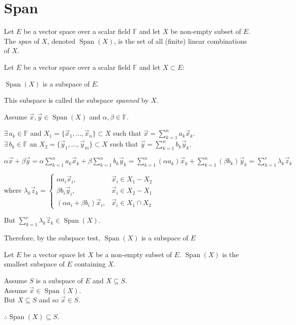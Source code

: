 \documentclass[letterpaper,12pt,fleqn]{article}
\renewcommand{\a}{\alpha}
\renewcommand{\b}{\beta}
\renewcommand{\l}{\lambda}
\newcommand{\F}{\mathbb{F}}
\newcommand{\vx}{\vec{x}}
\newcommand{\vy}{\vec{y}}
\newcommand{\vz}{\vec{z}}
\DeclareMathOperator{\spn}{Span}
\begin{document}
\section*{Span}

\begin{definition}[Span]
  Let $E$ be a vector space over a scalar field $\F$ and let $X$ be non-empty
  subset of $E$. The \emph{span} of $X$, denoted $\spn(X)$, is the set of all
  (finite) linear combinations of $X$.
\end{definition}

\begin{theorem}
  Let $E$ be a vector space over a scalar field $\F$ and let $X\subset E$:

  \qquad$\spn(X)$ is a subspace of $E$.

  This subspace is called the subspace \emph{spanned} by $X$.
\end{theorem}

\begin{theproof}
  Assume $\vx,\vy\in\spn(X)$ and $\a,\b\in\F$.
  
  $\exists\,a_k\in\F$ and $X_1=\{\vx_1,\ldots,\vx_n\}\subset X$ such that
  $\vx=\sum_{k=1}^na_k\vx_k$. \\
  $\exists\,b_k\in\F$ an $X_2=\{\vy_1,\ldots,\vy_m\}\subset X$ such that
  $\vy=\sum_{k=1}^nb_k\vy_k$.

  $\a\vx+\b\vy=\a\sum_{k=1}^na_k\vx_k+\b\sum_{k=1}^nb_k\vy_k=
  \sum_{k=1}^n(\a a_k)\vx_k+\sum_{k=1}^n(\b b_k)\vy_k=
  \sum_{k=1}^r\l_k\vz_k$

  where $\l_k\vz_k=\begin{cases}
  \a a_i\vx_i, & \vx_i\in X_1-X_2 \\
  \b b_i\vy_i, & \vx_i\in X_2-X_1 \\
  (\a a_i+\b b_i)\vx_i, & \vx_i\in X_1\cap X_2
  \end{cases}$

  But $\sum_{k=1}^r\l_k\vz_k\in\spn(X)$.

  Therefore, by the subspace test, $\spn(X)$ is a subspace of $E$
\end{theproof}

\begin{theorem}
  Let $E$ be a vector space let $X$ be a non-empty subset of $E$. $\spn(X)$ is
  the smallest subspace of $E$ containing $X$.
\end{theorem}

\begin{theproof}
  Assume $S$ is a subspace of $E$ and $X\subseteq S$. \\
  Assume $\vx\in\spn(X)$. \\
  But $X\subseteq S$ and so $\vx\in S$.

  $\therefore\spn(X)\subseteq S$.
\end{theproof}
\end{document}
